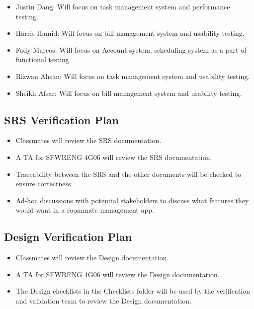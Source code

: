 \documentclass[12pt, titlepage]{article}
\begin{document}
\begin{itemize}
    \item Justin Dang: Will focus on task management system and performance testing.
    \item Harris Hamid: Will focus on bill management system and usability testing.
    \item Fady Marcos: Will focus on Account system, scheduling system as a part of functional testing
    \item Rizwan Ahsan: Will focus on task management system and usability testing. 
    \item Sheikh Afsar: Will focus on bill management system and usability testing.
\end{itemize}



\subsection{SRS Verification Plan}

\begin{itemize}
    \item Classmates will review the SRS documentation.
    \item A TA for SFWRENG 4G06 will review the SRS documentation.
    \item Traceability between the SRS and the other documents will be checked to ensure correctness.
    \item Ad-hoc discussions with potential stakeholders to discuss what features they would want in a roommate management app.
\end{itemize}



\subsection{Design Verification Plan}


\begin{itemize}
    \item Classmates will review the Design documentation.
    \item A TA for SFWRENG 4G06 will review the Design documentation.
    \item The Design checklists in the Checklists folder will be used by the verification and validation team to review the Design documentation.
\end{itemize}
\end{document}
